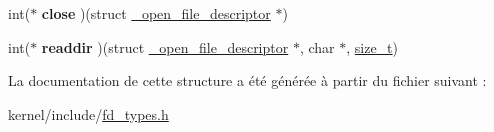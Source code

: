 \begin{DoxyCompactItemize}
\item 
\hypertarget{struct__open__file__operations__t_a187ebd3d665fde0a486bd7f5d3001f00}{int($\ast$ {\bfseries close} )(struct \hyperlink{struct__open__file__descriptor}{\-\_\-open\-\_\-file\-\_\-descriptor} $\ast$)}\label{struct__open__file__operations__t_a187ebd3d665fde0a486bd7f5d3001f00}

\item 
\hypertarget{struct__open__file__operations__t_a7cdb4947735c5559610fb8be2472791d}{int($\ast$ {\bfseries readdir} )(struct \hyperlink{struct__open__file__descriptor}{\-\_\-open\-\_\-file\-\_\-descriptor} $\ast$, char $\ast$, \hyperlink{kernel_2include_2types_8h_a29d85914ddff32967d85ada69854206d}{size\-\_\-t})}\label{struct__open__file__operations__t_a7cdb4947735c5559610fb8be2472791d}

\end{DoxyCompactItemize}


La documentation de cette structure a été générée à partir du fichier suivant \-:\begin{DoxyCompactItemize}
\item 
kernel/include/\hyperlink{fd__types_8h}{fd\-\_\-types.\-h}\end{DoxyCompactItemize}

